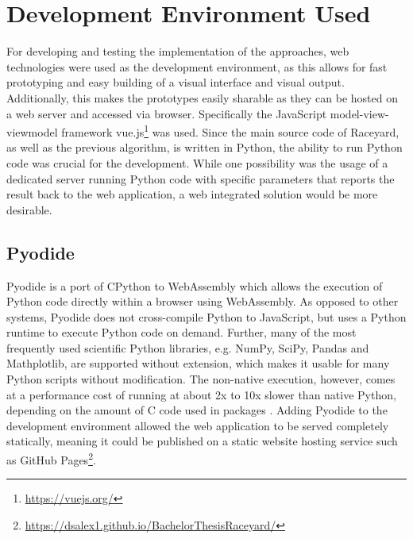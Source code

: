 \section{Development Environment Used}
For developing and testing the implementation of the approaches, web technologies were used as the development environment, as this allows for fast prototyping and easy building of a visual interface and visual output. Additionally, this makes the prototypes easily sharable as they can be hosted on a web server and accessed via browser. Specifically the JavaScript model-view-viewmodel framework vue.js\footnote{\url{https://vuejs.org/}} was used. Since the main source code of Raceyard, as well as the previous algorithm, is written in Python, the ability to run Python code was crucial for the development. While one possibility was the usage of a dedicated server running Python code with specific parameters that reports the result back to the web application, a web integrated solution would be more desirable.

\subsection{Pyodide}
Pyodide is a port of CPython to WebAssembly \cite{pyodide} which allows the execution of Python code directly within a browser using WebAssembly. As opposed to other systems, Pyodide does not cross-compile Python to JavaScript, but uses a Python runtime to execute Python code on demand. Further, many of the most frequently used scientific Python libraries, e.g. NumPy, SciPy, Pandas and Mathplotlib, are supported without extension, which makes it usable for many Python scripts without modification. The non-native execution, however, comes at a performance cost of running at about 2x to 10x slower than native Python, depending on the amount of C code used in packages \cite{pyodide2021}\cite{Jangda2019}. Adding Pyodide to the development environment allowed the web application to be served completely statically, meaning it could be published on a static website hosting service such as GitHub Pages\footnote{\url{https://dsalex1.github.io/BachelorThesisRaceyard/}}.